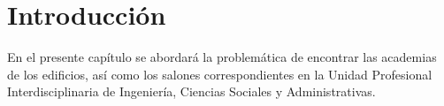 \chapter{Introducción}
En el presente capítulo se abordará la problemática de encontrar las academias de los edificios, así como los salones correspondientes en la Unidad Profesional Interdisciplinaria de Ingeniería, Ciencias Sociales y Administrativas.

	
	
	
	